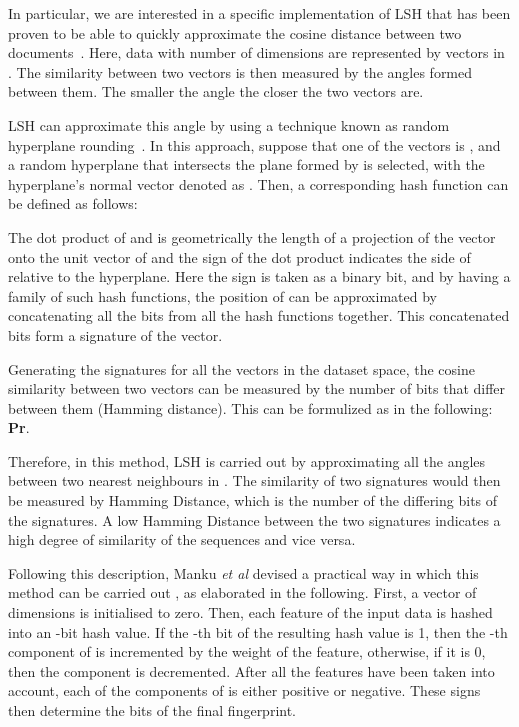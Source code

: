 \documentclass[titlepage]{csetr}
\begin{document}
In particular, we are interested in a specific implementation of LSH that has been proven to be able to quickly approximate the cosine distance between two documents~\cite{Simhash}. Here, data with  number of dimensions are represented by vectors in . The similarity between two vectors is then measured by the angles formed between them. The smaller the angle the closer the two vectors are.

LSH can approximate this angle by using a technique known as random hyperplane rounding~\cite{Simhash}. In this approach, suppose that one of the vectors is , and a random hyperplane that intersects the plane formed by  is selected, with the hyperplane's normal vector denoted as . Then, a corresponding hash function  can be defined as follows:



The dot product of  and  is geometrically the length of a projection of the vector  onto the unit vector of  and the sign of the dot product indicates the side of  relative to the hyperplane. Here the sign is taken as a binary bit, and by having a family of such hash functions, the position of  can be approximated by concatenating all the bits from all the hash functions together. This concatenated bits form a signature of the vector.

Generating the signatures for all the vectors in the dataset space, the cosine similarity between two vectors can be measured by the number of bits that differ between them (Hamming distance). This can be formulized as in the following:
\textbf{Pr}.

Therefore, in this method, LSH is carried out by approximating all the angles between two nearest neighbours in . The similarity of two signatures would then be measured by Hamming Distance, which is the number of the differing bits of the signatures. A low Hamming Distance between the two signatures indicates a high degree of similarity of the sequences and vice versa.

Following this description, Manku \emph{et al} devised a practical way in which this method can be carried out \cite{MankuSimhash}, as elaborated in the following. First, a vector  of  dimensions is initialised to zero. Then, each feature of the input data is hashed into an -bit hash value. If the -th bit of the resulting hash value is 1, then the -th component of  is incremented by the weight of the feature, otherwise, if it is 0, then the component is decremented. After all the features have been taken into account, each of the components of  is either positive or negative. These signs then determine the bits of the final fingerprint.
\end{document}
